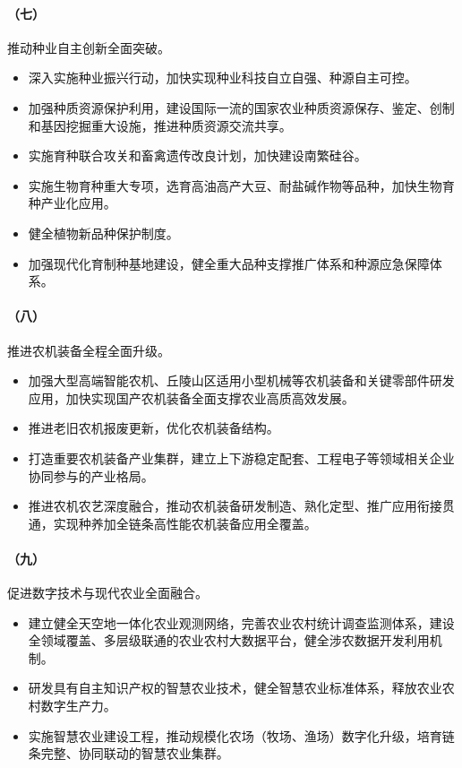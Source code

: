 \paragraph{（七）}推动种业自主创新全面突破。

\begin{itemize}
    \item 深入实施种业振兴行动，加快实现种业科技自立自强、种源自主可控。
    \item 加强种质资源保护利用，建设国际一流的国家农业种质资源保存、鉴定、创制和基因挖掘重大设施，推进种质资源交流共享。
    \item 实施育种联合攻关和畜禽遗传改良计划，加快建设南繁硅谷。
    \item 实施生物育种重大专项，选育高油高产大豆、耐盐碱作物等品种，加快生物育种产业化应用。
    \item 健全植物新品种保护制度。
    \item 加强现代化育制种基地建设，健全重大品种支撑推广体系和种源应急保障体系。
\end{itemize}

\paragraph{（八）}推进农机装备全程全面升级。

\begin{itemize}
    \item 加强大型高端智能农机、丘陵山区适用小型机械等农机装备和关键零部件研发应用，加快实现国产农机装备全面支撑农业高质高效发展。
    \item 推进老旧农机报废更新，优化农机装备结构。
    \item 打造重要农机装备产业集群，建立上下游稳定配套、工程电子等领域相关企业协同参与的产业格局。
    \item 推进农机农艺深度融合，推动农机装备研发制造、熟化定型、推广应用衔接贯通，实现种养加全链条高性能农机装备应用全覆盖。
\end{itemize}

\paragraph{（九）}促进数字技术与现代农业全面融合。

\begin{itemize}
    \item 建立健全天空地一体化农业观测网络，完善农业农村统计调查监测体系，建设全领域覆盖、多层级联通的农业农村大数据平台，健全涉农数据开发利用机制。
    \item 研发具有自主知识产权的智慧农业技术，健全智慧农业标准体系，释放农业农村数字生产力。
    \item 实施智慧农业建设工程，推动规模化农场（牧场、渔场）数字化升级，培育链条完整、协同联动的智慧农业集群。
\end{itemize}

